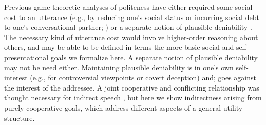\documentclass[9pt,twocolumn,twoside,lineno]{main_class_file}
\begin{document}
Previous game-theoretic analyses of politeness have either required some social cost to an utterance (e.g., by reducing one's social status or incurring social debt to one's conversational partner; \cite{vanRooy2003}) or a separate notion of plausible deniability \cite{pinker2008}.
The necessary kind of utterance cost would involve higher-order reasoning about others, and may be able to be defined in terms the more basic social and self-presentational goals we formalize here. 
A separate notion of plausible deniability may not be need either.
Maintaining plausible deniability is in one's own self-interest (e.g., for controversial viewpoints or covert deception) and; goes against the interest of the addressee.
A joint cooperative and conflicting relationship was thought necessary for indirect speech \cite{pinker2008}, but here we show indirectness arising from purely cooperative goals, which address different aspects of a general utility structure. 


%
\end{document}
